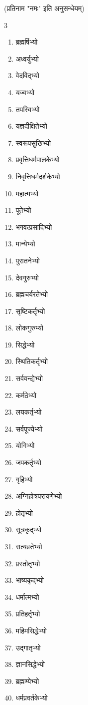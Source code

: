 \centerline{(प्रतिनाम "नमः" इति अनुसन्धेयम्)}

\begin{multicols}{3}
\begin{enumerate}
\item ब्रह्मर्षिभ्यो
\item अध्वर्युभ्यो
\item वेदविद्भ्यो
\item यज्वभ्यो
\item तपस्विभ्यो
\item यज्ञदीक्षितेभ्यो
\item स्वरूपसुखिभ्यो
\item प्रवृत्तिधर्मपालकेभ्यो
\item निवृत्तिधर्मदर्शकेभ्यो
\item महात्मभ्यो
\item पूतेभ्यो
\item भगवत्प्रसादिभ्यो
\item मान्येभ्यो
\item पुरातनेभ्यो
\item देवगुरुभ्यो
\item ब्रह्मचर्यरतेभ्यो
\item सृष्टिकर्तृभ्यो
\item लोकगुरुभ्यो
\item सिद्धेभ्यो
\item स्थितिकर्तृभ्यो
\item सर्ववन्द्येभ्यो
\item कर्मठेभ्यो
\item लयकर्तृभ्यो
\item सर्वपूज्येभ्यो
\item योगिभ्यो
\item जपकर्तृभ्यो
\item गृहिभ्यो
\item अग्निहोत्रपरायणेभ्यो
\item होतृभ्यो
\item सूत्रकृद्भ्यो
\item सत्यव्रतेभ्यो
\item प्रस्तोतृभ्यो
\item भाष्यकृद्भ्यो
\item धर्मात्मभ्यो
\item प्रतिहर्तृभ्यो
\item महिमसिद्धेभ्यो
\item उद्गातृभ्यो
\item ज्ञानसिद्धेभ्यो
\item ब्रह्मण्येभ्यो
\item धर्मप्रवर्तकेभ्यो

\end{enumerate}
\end{multicols}
